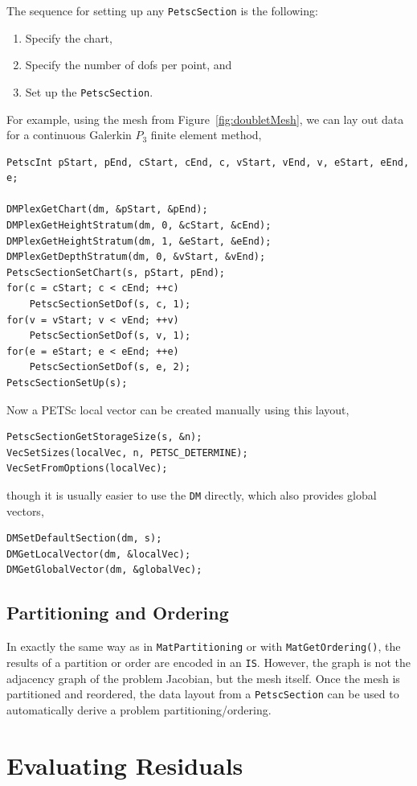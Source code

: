 The sequence for setting up any \lstinline{PetscSection} is the following:
\begin{enumerate}
  \item Specify the chart,
  \item Specify the number of dofs per point, and
  \item Set up the \lstinline{PetscSection}.
\end{enumerate}
For example, using the mesh from Figure~\ref{fig:doubletMesh}, we can lay out data for a continuous Galerkin $P_3$ finite
element method,
\begin{lstlisting}
PetscInt pStart, pEnd, cStart, cEnd, c, vStart, vEnd, v, eStart, eEnd, e;

DMPlexGetChart(dm, &pStart, &pEnd);
DMPlexGetHeightStratum(dm, 0, &cStart, &cEnd);
DMPlexGetHeightStratum(dm, 1, &eStart, &eEnd);
DMPlexGetDepthStratum(dm, 0, &vStart, &vEnd);
PetscSectionSetChart(s, pStart, pEnd);
for(c = cStart; c < cEnd; ++c)
    PetscSectionSetDof(s, c, 1);
for(v = vStart; v < vEnd; ++v)
    PetscSectionSetDof(s, v, 1);
for(e = eStart; e < eEnd; ++e)
    PetscSectionSetDof(s, e, 2);
PetscSectionSetUp(s);
\end{lstlisting}
Now a PETSc local vector can be created manually using this layout,
\begin{lstlisting}
PetscSectionGetStorageSize(s, &n);
VecSetSizes(localVec, n, PETSC_DETERMINE);
VecSetFromOptions(localVec);
\end{lstlisting}
though it is usually easier to use the \lstinline{DM} directly, which also provides global vectors,
\begin{lstlisting}
DMSetDefaultSection(dm, s);
DMGetLocalVector(dm, &localVec);
DMGetGlobalVector(dm, &globalVec);
\end{lstlisting}

\subsection{Partitioning and Ordering}

In exactly the same way as in \lstinline{MatPartitioning} or with \lstinline{MatGetOrdering()}, the results of a partition or order are encoded in an
\lstinline{IS}. However, the graph is not the adjacency graph of the problem Jacobian, but the mesh
itself. Once the mesh is partitioned and reordered, the data layout from a \lstinline{PetscSection} can be used to automatically derive
a problem partitioning/ordering.

\section{Evaluating Residuals} 

